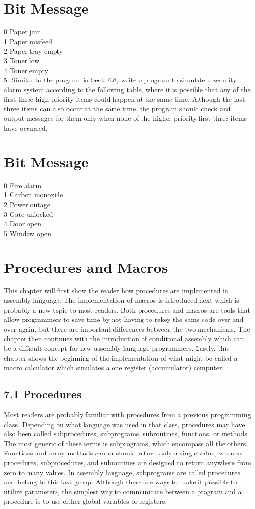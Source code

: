 \documentclass[10pt]{article}
\begin{document}
\section*{Bit Message}
0 Paper jam\\
1 Paper misfeed\\
2 Paper tray empty\\
3 Toner low\\
4 Toner empty\\
5. Similar to the program in Sect. 6.8, write a program to simulate a security alarm system according to the following table, where it is possible that any of the first three high-priority items could happen at the same time. Although the last three items can also occur at the same time, the program should check and output messages for them only when none of the higher priority first three items have occurred.

\section*{Bit Message}
0 Fire alarm\\
1 Carbon monoxide\\
2 Power outage\\
3 Gate unlocked\\
4 Door open\\
5 Window open

\section*{Procedures and Macros}
This chapter will first show the reader how procedures are implemented in assembly language. The implementation of macros is introduced next which is probably a new topic to most readers. Both procedures and macros are tools that allow programmers to save time by not having to rekey the same code over and over again, but there are important differences between the two mechanisms. The chapter then continues with the introduction of conditional assembly which can be a difficult concept for new assembly language programmers. Lastly, this chapter shows the beginning of the implementation of what might be called a macro calculator which simulates a one register (accumulator) computer.

\subsection*{7.1 Procedures}
Most readers are probably familiar with procedures from a previous programming class. Depending on what language was used in that class, procedures may have also been called subprocedures, subprograms, subroutines, functions, or methods. The most generic of these terms is subprograms, which encompass all the others. Functions and many methods can or should return only a single value, whereas procedures, subprocedures, and subroutines are designed to return anywhere from zero to many values. In assembly language, subprograms are called procedures and belong to this last group. Although there are ways to make it possible to utilize parameters, the simplest way to communicate between a program and a procedure is to use either global variables or registers.
\end{document}
